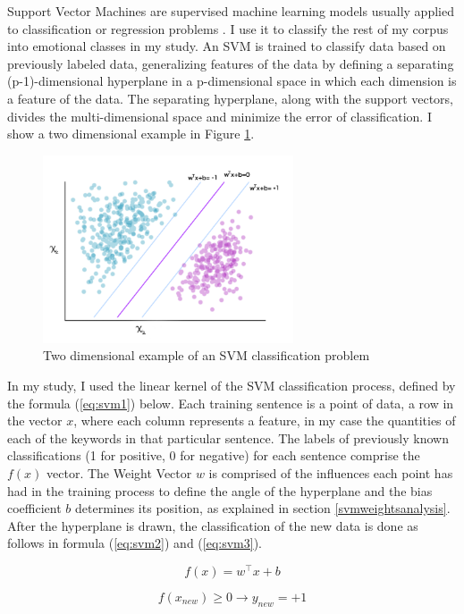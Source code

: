 \documentclass[review]{elsarticle}
\begin{document}
Support Vector Machines are supervised machine learning models usually applied to classification or regression problems \cite{cortes1995}. I use it to classify the rest of my corpus into emotional classes in my study. An SVM is trained to classify data based on previously labeled data, generalizing features of the data by defining a separating (p-1)-dimensional hyperplane in a p-dimensional space in which each dimension is a feature of the data. The separating hyperplane, along with the support vectors, divides the multi-dimensional space and minimize the error of classification. I show a two dimensional example in Figure \ref{fig:svm2d}.

\begin{figure}[bp]
\centering
\includegraphics[width=20em]{figures/SVM_2d_example.png}
\caption{Two dimensional example of an SVM classification problem}
\label{fig:svm2d}
\end{figure}

In my study, I used the linear kernel of the SVM classification process, defined by the formula (\ref{eq:svm1}) below. Each training sentence is a point of data, a row in the vector \(x\), where each column represents a feature, in my case the quantities of each of the keywords in that particular sentence. The labels of previously known classifications (1 for positive, 0 for negative) for each sentence comprise the \(f(x)\) vector. The Weight Vector \(w\) is comprised of the influences each point has had in the training process to define the angle of the hyperplane and the bias coefficient \(b\) determines its position, as explained in section \ref{svmweightsanalysis}. After the hyperplane is drawn, the classification of the new data is done as follows in formula (\ref{eq:svm2}) and (\ref{eq:svm3}).

\begin{equation}\label{eq:svm1}
f(x) = w^\top x + b
\end{equation}

\begin{equation}\label{eq:svm2}
f(x_{new})\geq 0 \rightarrow y_{new} = +1 
\end{equation}
\end{document}
